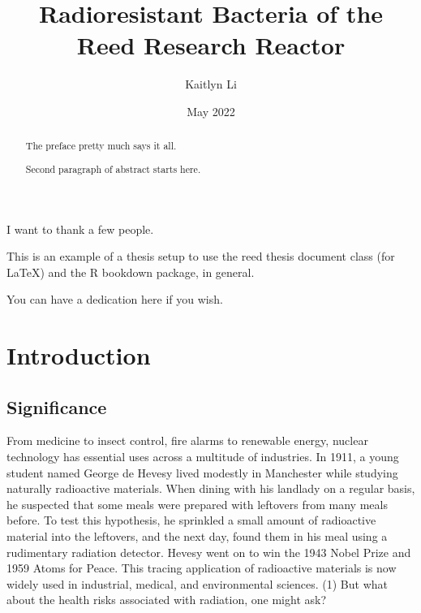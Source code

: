 \documentclass[12pt,twoside]{reedthesis}
\title{Radioresistant Bacteria of the Reed Research Reactor}
\author{Kaitlyn Li}
\date{May 2022}
\begin{document}
  \maketitle

\frontmatter %
\pagestyle{empty} %
  \begin{acknowledgements}
    I want to thank a few people.
  \end{acknowledgements}
  \begin{preface}
    This is an example of a thesis setup to use the reed thesis document class
    (for LaTeX) and the R bookdown package, in general.
  \end{preface}
  \hypersetup{linkcolor=black}
  \setcounter{secnumdepth}{2}
  \setcounter{tocdepth}{2}
  \tableofcontents

  \listoftables

  \listoffigures
  \begin{abstract}
    The preface pretty much says it all.
    
    \par
    
    Second paragraph of abstract starts here.
  \end{abstract}
  \begin{dedication}
    You can have a dedication here if you wish.
  \end{dedication}
\mainmatter %
\pagestyle{fancyplain} %

\hypertarget{introduction}{%
\chapter*{Introduction}\label{introduction}}

\hypertarget{significance}{%
\section{Significance}\label{significance}}

From medicine to insect control, fire alarms to renewable energy, nuclear technology has essential uses across a multitude of industries. In 1911, a young student named George de Hevesy lived modestly in Manchester while studying naturally radioactive materials. When dining with his landlady on a regular basis, he suspected that some meals were prepared with leftovers from many meals before. To test this hypothesis, he sprinkled a small amount of radioactive material into the leftovers, and the next day, found them in his meal using a rudimentary radiation detector. Hevesy went on to win the 1943 Nobel Prize and 1959 Atoms for Peace. This tracing application of radioactive materials is now widely used in industrial, medical, and environmental sciences. (1) But what about the health risks associated with radiation, one might ask?
\end{document}
